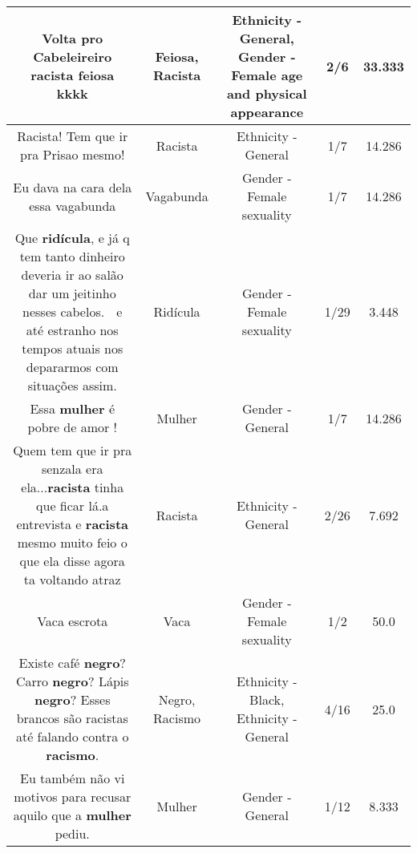 \documentclass[11pt]{article}
\newlength\mylength
\begin{document}
\begin{center}
\begin{longtable}{|C{.65\mylength}|C{.30\mylength}|C{.12\mylength}|C{.12\mylength}|C{.12\mylength}|}
  \small Volta pro Cabeleireiro \textbf{racista} \textbf{feiosa} kkkk\normalsize   & Feiosa, Racista & Ethnicity - General, Gender - Female age and physical appearance & 2/6 & 33.333 \\  \hline
  \small Racista! Tem que ir pra Prisao mesmo!\normalsize   & Racista & Ethnicity - General & 1/7 & 14.286 \\  \hline
  \small Eu dava  na cara dela essa vagabunda\normalsize   & Vagabunda & Gender - Female sexuality & 1/7 & 14.286 \\  \hline
  \small Que \textbf{ridícula}, e já q tem tanto dinheiro deveria ir ao salão dar um jeitinho nesses cabelos. 🤔 e até estranho nos tempos atuais nos depararmos com situações assim.\normalsize   & Ridícula & Gender - Female sexuality & 1/29 & 3.448 \\  \hline
  \small Essa \textbf{mulher} é pobre de amor !\normalsize   & Mulher & Gender - General & 1/7 & 14.286 \\  \hline
  \small Quem tem que ir pra senzala era ela...\textbf{racista} tinha que ficar lá.a entrevista e \textbf{racista} mesmo muito feio o que ela disse agora ta voltando atraz\normalsize   & Racista & Ethnicity - General & 2/26 & 7.692 \\  \hline
  \small Vaca escrota\normalsize   & Vaca & Gender - Female sexuality & 1/2 & 50.0 \\  \hline
  \small Existe café \textbf{negro}? Carro \textbf{negro}? Lápis \textbf{negro}? Esses brancos são racistas até falando contra o \textbf{racismo}.\normalsize   & Negro, Racismo & Ethnicity - Black, Ethnicity - General & 4/16 & 25.0 \\  \hline
  \small Eu também não vi motivos para recusar aquilo que a \textbf{mulher} pediu.\normalsize   & Mulher & Gender - General & 1/12 & 8.333 \\  \hline

\end{longtable}
\end{center}
\end{document}
